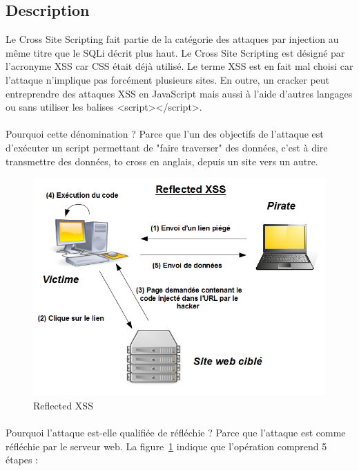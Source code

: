 \subsection{Description}
Le Cross Site Scripting fait partie de la catégorie des attaques par injection au même titre que le SQLi décrit plus haut. Le Cross Site Scripting est désigné par l'acronyme XSS car CSS était déjà utilisé. Le terme XSS est en fait mal choisi car l'attaque n'implique pas forcément plusieurs sites. En outre, un cracker peut entreprendre des attaques XSS en JavaScript mais aussi à l'aide d’autres langages ou sans utiliser les balises <script></script>.

\paragraph{} Pourquoi cette dénomination ? Parce que l'un des objectifs de l'attaque est d’exécuter un script permettant de "faire traverser" des données, c'est à dire transmettre des données, to cross en anglais, depuis un site vers un autre. 

\begin{figure}[H] %
	\begin{center} 
		\includegraphics[scale=\scalekad]{images/xss/reflected_xss}
		\caption{Reflected XSS}
		\label{reflected_xss}  %
	\end{center}
\end{figure}


\paragraph{} Pourquoi l'attaque est-elle qualifiée de réfléchie ? Parce que l'attaque est comme réfléchie par le serveur web. La figure~\ref{reflected_xss} indique que l'opération comprend 5 étapes :


